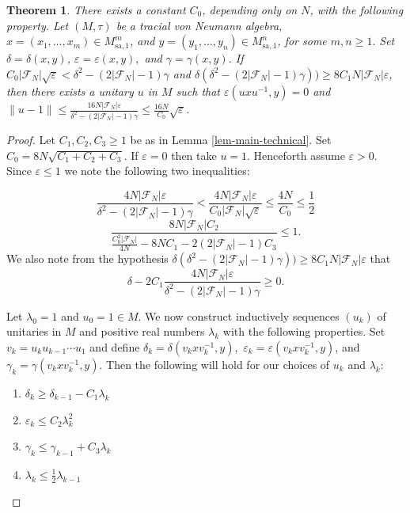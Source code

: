 \documentclass[10pt]{amsart}
\numberwithin{equation}{section}
\newtheorem{thm}{Theorem}[section]
\theoremstyle{definition}
\newcommand{\cF}{\mathcal{F}}
\newcommand{\ee}{\varepsilon}
\begin{document}
\begin{thm}\label{thm-main-technical}
    There exists a constant $C_0$, depending only on $N$, with the following property. Let $(M,\tau)$ be a tracial von Neumann algebra, $x = (x_1,\ldots,x_m)\in M_{\mathrm{sa},1}^m$, and $y = (y_1,\ldots,y_n)\in M_{\mathrm{sa},1}^n$, for some $m,n\ge1.$ Set $\delta = \delta(x,y)$, $\ee= \ee(x,y),$ and $\gamma = \gamma(x,y)$. If $C_0|\cF_N|\sqrt{\ee} < \delta^2 - (2|\cF_N|-1)\gamma$ and $\delta(\delta^2-(2|\cF_N|-1)\gamma)) \ge 8C_1N|\cF_N|\ee$, then  there exists a unitary $u$ in $M$ such that $\ee(uxu^{-1},y)=0$ and $\|u-1\| \le \frac{16N|\cF_N|\ee}{\delta^2 - (2|\cF_N|-1)\gamma} \le \frac{16N}{C_0}\sqrt{\ee}$.
\end{thm}

\begin{proof}
    Let $C_1,C_2,C_3\ge1$ be as in Lemma \ref{lem-main-technical}. Set $C_0 = 8N\sqrt{C_1+C_2+C_3}$. If $\ee=0$ then take $u=1$. Henceforth assume $\ee > 0$. Since $\ee \le 1$ we note the following two inequalities:

    \begin{equation}\label{eqn-def-lambda}
        \frac{4N|\cF_N|\ee}{\delta^2 - (2|\cF_N|-1)\gamma} < \frac{4N|\cF_N|\ee}{C_0|\cF_N|\sqrt{\ee}} \le \frac{4N}{C_0} \le \frac{1}{2}
    \end{equation}
    \begin{equation}\label{eqn-def-C0}
        \frac{8N|\cF_N|C_2}{\frac{C_0^2|\cF_N|}{4N} - 8NC_1 - 2(2|\cF_N|-1)C_3} \le 1.
    \end{equation}
    We also note from the hypothesis $\delta(\delta^2-(2|\cF_N|-1)\gamma)) \ge 8C_1N|\cF_N|\ee$ that
    \begin{equation}\label{eqn-pos-delta}
        \delta - 2C_1\frac{4N|\cF_N|\ee}{\delta^2 - (2|\cF_N|-1)\gamma} \ge 0.
    \end{equation}

    Let $\lambda_0 = 1$ and $u_0 = 1\in M$. We now construct inductively sequences $(u_k)$ of unitaries in $M$ and positive real numbers $\lambda_k$ with the following properties. Set $v_k = u_ku_{k-1}\cdots u_1$ and define $\delta_k = \delta(v_kxv_k^{-1},y),$ $\ee_k = \ee(v_kxv_k^{-1},y)$, and $\gamma_k = \gamma(v_kxv_k^{-1},y)$. Then the following will hold for our choices of $u_k$ and $\lambda_k$:
    \begin{enumerate}
        \item $\delta_k \ge \delta_{k-1} - C_1\lambda_k$
        \item $\ee_k \le C_2\lambda_k^2$
        \item $\gamma_k \le \gamma_{k-1} + C_3\lambda_k$
        \item $\lambda_k\le \frac{1}{2}\lambda_{k-1}$
    \end{enumerate}


\end{proof}
\end{document}

